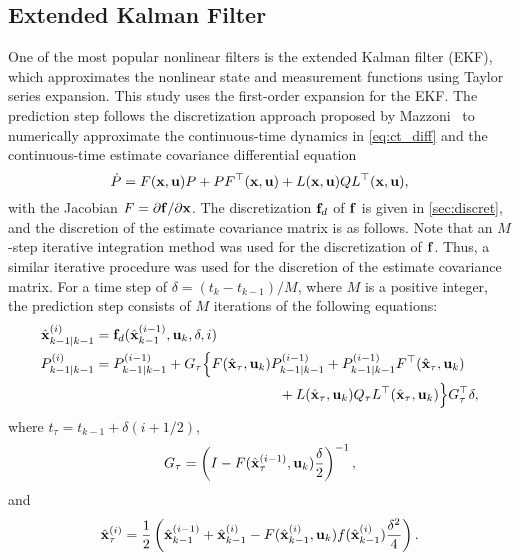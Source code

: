 \documentclass[../zhang_thesis.tex]{subfiles}
\begin{document}
\subsection{Extended Kalman Filter}
\label{sec:ekf}

One of the most popular nonlinear filters is the extended Kalman filter (EKF), which approximates the nonlinear state and measurement functions using Taylor series expansion. This study uses the first-order expansion for the EKF. The prediction step follows the discretization approach proposed by Mazzoni~\cite{mazzoni07} to numerically approximate the continuous-time dynamics in \cref{eq:ct_diff} and the continuous-time estimate covariance differential equation
\begin{equation}
    \dot{P} = F(\mathbf{x},\mathbf{u}) P + P F^\top(\mathbf{x},\mathbf{u}) + L(\mathbf{x},\mathbf{u}) Q L^\top(\mathbf{x},\mathbf{u}),
\end{equation}
with the Jacobian $F=\partial\mathbf{f}/\partial\mathbf{x}$. The discretization $\mathbf{f}_d$ of $\mathbf{f}$ is given in \cref{sec:discret}, and the discretion of the estimate covariance matrix is as follows. Note that an $M$-step iterative integration method was used for the discretization of $\mathbf{f}$. Thus, a similar iterative procedure was used for the discretion of the estimate covariance matrix. For a time step of $\delta=(t_k-t_{k-1})/M$, where $M$ is a positive integer, the prediction step consists of $M$
iterations of the following equations:
\begin{align}
    \hat{\vx}_{k-1|k-1}^{(i)} &= \vf_d(\hat{\vx}_{k-1}^{(i-1)},\vu_k,\delta,i) \label{eq:ekfpredx} \\
    P_{k-1|k-1}^{(i)} &= \begin{multlined}[t] P_{k-1|k-1}^{(i-1)} + G_\tau \Big\{ F(\hat{\vx}_\tau,\vu_k) P_{k-1|k-1}^{(i-1)} + P_{k-1|k-1}^{(i-1)} F^\top(\hat{\vx}_\tau,\vu_k) \\ + L(\hat{\vx}_\tau,\vu_k) Q_\tau L^\top(\hat{\vx}_\tau,\vu_k) \Big\} G_\tau^\top \delta, \end{multlined} \label{eq:ekfpredz}
\end{align}
where $t_\tau = t_{k-1}+\delta(i+1/2)$, 
\begin{equation}
    G_\tau = \left( I - F(\hat{\mathbf{x}}^{(i-1)}_\tau,\mathbf{u}_k) \frac{\delta}{2} \right)^{-1},
\end{equation}
and
\begin{equation}
    \hat{\mathbf{x}}^{(i)}_\tau = \frac{1}{2} \left( \hat{\mathbf{x}}_{k-1}^{(i-1)} + \hat{\mathbf{x}}_{k-1}^{(i)} - F(\hat{\mathbf{x}}_{k-1}^{(i)},\mathbf{u}_k) f(\hat{\mathbf{x}}_{k-1}^{(i)}) \frac{\delta^2}{4} \right).
\end{equation}
\end{document}
